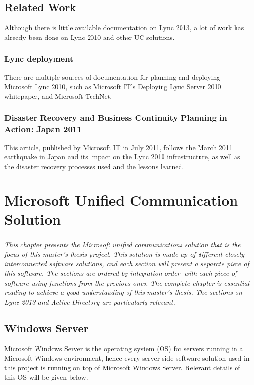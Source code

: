 \section{Related Work}

Although there is little available documentation on Lync 2013, a lot of work has already been done on Lync 2010 and other UC solutions.

\subsection{Lync deployment}
There are multiple sources of documentation for planning and deploying Microsoft Lync 2010, such as Microsoft IT's Deploying Lync Server 2010 whitepaper\cite{microsoft_it_showcase_deploying_2011}, and Microsoft TechNet\cite{microsoft_technet_microsoft_2013}.


\subsection{Disaster Recovery and Business Continuity Planning in Action: Japan 2011}
This article, published by Microsoft IT in July 2011, follows the March 2011 earthquake in Japan and its impact on the Lync 2010 infrastructure, as well as the disaster recovery processes used and the lessons learned\cite{microsoft_it_showcase_disaster_2011}.

\chapter{Microsoft Unified Communication Solution}\label{chapter_ms_UC}
\paragraph{}
\textit{This chapter presents the Microsoft unified communications solution that is the focus of this master's thesis project. This solution is made up of different closely interconnected software solutions, and each section will present a separate piece of this software. The sections are ordered by integration order, with each piece of software using functions from the previous ones.}
\textit{The complete chapter is essential reading to achieve a good understanding of this master's thesis. The sections on Lync 2013 and Active Directory are particularly relevant.}

\section{Windows Server}
Microsoft Windows Server is the operating system (OS) for servers running in a Microsoft Windows environment, hence every server-side software solution used in this project is running on top of Microsoft Windows Server. Relevant details of this OS will be given below.

